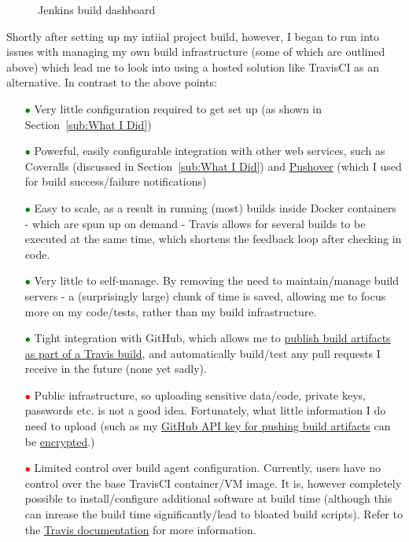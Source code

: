 \begin{figure}
  \noindent{}
  \centering
  \caption{Jenkins build dashboard}
  \label{fig:jenkinsDashboard}
\end{figure}

Shortly after setting up my intiial project build, however, I began to run into
issues with managing my own build infrastructure (some of which are outlined
above) which lead me to look into using a hosted solution like TravisCI as an
alternative. In contrast to the above points:

\begin{itemize}
  \item[\textcolor{green}{$\bullet$}] Very little configuration required to get
  set up (as shown in Section~\ref{sub:What I Did})
  \item[\textcolor{green}{$\bullet$}] Powerful, easily configurable integration
  with other web services, such as Coveralls
  (discussed in Section~\ref{sub:What I Did}) and \href{https://pushover.net/}{Pushover}
  (which I used for build success/failure notifications)
  \item[\textcolor{green}{$\bullet$}] Easy to scale, as a result in running (most)
  builds inside Docker containers - which are spun up on demand - Travis allows
  for several builds to be executed at the same time, which shortens the feedback
  loop after checking in code.
  \item[\textcolor{green}{$\bullet$}] Very little to self-manage. By removing the
  need to maintain/manage build servers - a (surprisingly large) chunk of time is
  saved, allowing me to focus more on my code/tests, rather than my build infrastructure.
  \item[\textcolor{green}{$\bullet$}] Tight integration with GitHub, which allows
  me to
  \href{https://github.com/FireEater64/gamq/releases}{publish build artifacts as part of a Travis build},
  and automatically build/test any pull requests I receive in the future (none yet sadly).
  \item[\textcolor{red}{$\bullet$}] Public infrastructure, so uploading sensitive
  data/code, private keys, passwords etc. is not a good idea. Fortunately, what little
  information I do need to upload (such as my \href{https://github.com/FireEater64/gamq/blob/aabc34061b46f5b743d62681e8d19a74c907ec83/.travis.yml#L27}{GitHub API key for pushing build artifacts}
  can be \href{https://docs.travis-ci.com/user/encryption-keys/}{encrypted}.)
  \item[\textcolor{red}{$\bullet$}] Limited control over build agent configuration. Currently,
  users have no control over the base TravisCI container/VM image. It is, however
  completely possible to install/configure additional software at build time
  (although this can inrease the build time significantly/lead to bloated build scripts).
  Refer to the \href{https://docs.travis-ci.com/user/ci-environment/#Virtualization-environments}{Travis documentation}
  for more information.
\end{itemize}

